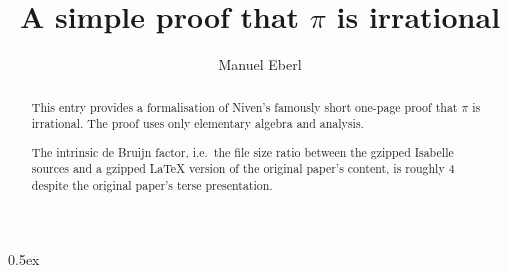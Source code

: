 \documentclass[11pt,a4paper]{article}
\begin{document}
\title{A simple proof that $\pi$ is irrational}
\author{Manuel Eberl}
\maketitle

\begin{abstract}
This entry provides a formalisation of Niven's famously
short one-page proof that $\pi$ is irrational. The proof uses
only elementary algebra and analysis.

The intrinsic de Bruijn factor, i.e.\ the file size ratio between
the gzipped Isabelle sources and a gzipped \LaTeX{} version of the original
paper's content, is roughly 4 despite the original paper's terse
presentation.
\end{abstract}

\tableofcontents

\newpage
\parindent 0pt\parskip 0.5ex



\nocite{niven1947}
\raggedright


\end{document}

